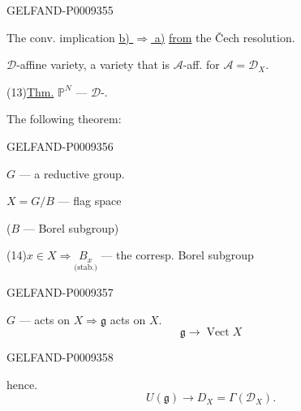 \begin{GelfandAdjacentEvidence}{GELFAND-P000935}{5}


The conv. implication \underline{b) $\Rightarrow$ a)} \underline{from} the Čech resolution.

$\mathcal D$-affine variety, a variety that is $\mathcal A$-aff. for $\mathcal A=\mathcal D_X$.

(13)\quad \underline{Thm.} $\mathbb P^N$ --- $\mathcal D$-.

The following theorem:
\end{GelfandAdjacentEvidence}
\begin{GelfandAdjacentEvidence}{GELFAND-P000935}{6}


$G$ --- a reductive group.

$X=G/B$ --- flag space

($B$ --- Borel subgroup)

(14)\quad $x\in X\Rightarrow\underset{\text{(stab.)}}{B_x}$ --- the corresp. Borel subgroup
\end{GelfandAdjacentEvidence}
\begin{GelfandAdjacentEvidence}{GELFAND-P000935}{7}


$G$ --- acts on $X\Rightarrow\mathfrak g$ acts on $X$.
\begin{equation*}
 \mathfrak g\longrightarrow\operatorname{Vect}X
 \tag{15}
\end{equation*}
\end{GelfandAdjacentEvidence}
\begin{GelfandAdjacentEvidence}{GELFAND-P000935}{8}


hence.
\begin{equation*}
 U(\mathfrak g)\longrightarrow D_X=\Gamma(\mathcal D_X).
 \tag{16}
\end{equation*}

\end{GelfandAdjacentEvidence}
